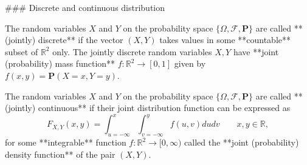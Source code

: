 ### Discrete and continuous distribution
\begin{definition}
The random variables $X$ and $Y$ on the probability space $\{ \Omega, \mathcal{F}, \mathbf{P} \}$ are called **(jointly) discrete** if the vector $(X, Y)$ takes values in some **countable** subset of $\mathbb{R}^2$ only. The jointly discrete random variables $X, Y$ have **joint (probability) mass function** $f : \mathbb{R}^2 \to [0,1]$ given by $f(x, y) = \mathbf{P}(X = x, Y = y)$. 
\end{definition}

\begin{definition}
The random variables $X$ and $Y$ on the probability space $\{ \Omega, \mathcal{F}, \mathbf{P} \}$ are called **(jointly) continuous** if their joint distribution function can be expressed as 
\begin{equation*}
    F_{X,Y}(x,y) = \int_{u = -\infty}^x \int_{v = -\infty}^y f(u,v)du dv \qquad x, y\in\mathbb{R},
\end{equation*}
for some **integrable** function $f : \mathbb{R}^2 \to [0, \infty)$ called the **joint (probability) density function** of the pair $(X, Y)$. 
\end{definition}

